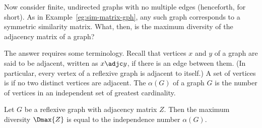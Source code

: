 Now consider finite, undirected graphs with no multiple edges (henceforth,
%
%
% 
for short).  As in Example~\ref{eg:sim-matrix-gph}, any such graph
corresponds to a symmetric similarity matrix.  What, then, is the maximum
diversity of the adjacency matrix of a graph?

The answer requires some terminology.  Recall that vertices $x$ and $y$ of
a graph are said to be adjacent, written as $x \adjc y$, if there
is an edge between them.  (In particular, every vertex of a reflexive graph
is adjacent to itself.)  A set of vertices is %
% 
% 
if no two distinct vertices are adjacent.  The  $\alpha(G)$ of a graph $G$ is the number of vertices in
an independent set of greatest cardinality.

\begin{propn}
Let $G$ be a reflexive graph with adjacency matrix $Z$.  Then the maximum
diversity $\Dmax{Z}$ is equal to the independence number $\alpha(G)$.
\end{propn}

